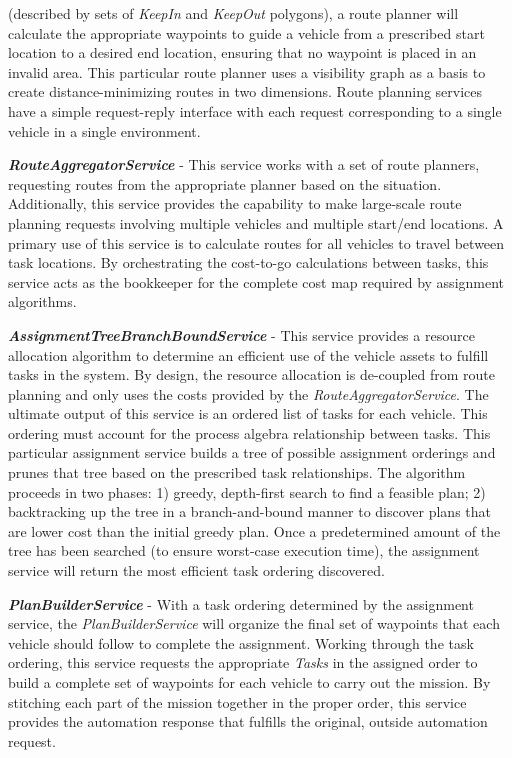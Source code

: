 \begin{description}
  (described by sets of \textit{KeepIn} and \textit{KeepOut} polygons), a route planner will
  calculate the appropriate waypoints to guide a vehicle from a prescribed start location to a
  desired end location, ensuring that no waypoint is placed in an invalid area. This particular
  route planner uses a visibility graph as a basis to create distance-minimizing routes in two
  dimensions. Route planning services have a simple request-reply interface with each request
  corresponding to a single vehicle in a single environment.
\item
  \textbf{\textit{RouteAggregatorService}} - This service works with a set of route planners,
  requesting routes from the appropriate planner based on the situation. Additionally, this service
  provides the capability to make large-scale route planning requests involving multiple vehicles
  and multiple start/end locations. A primary use of this service is to calculate routes for all
  vehicles to travel between task locations. By orchestrating the cost-to-go calculations
  between tasks, this service acts as the bookkeeper for the complete cost map required by
  assignment algorithms.
\item
  \textbf{\textit{AssignmentTreeBranchBoundService}} - This service provides a resource allocation
  algorithm to determine an efficient use of the vehicle assets to fulfill tasks in the system. By
  design, the resource allocation is de-coupled from route planning and only uses the costs
  provided by the \textit{RouteAggregatorService}. The ultimate output of this service is an ordered
  list of tasks for each vehicle. This ordering must account for the process algebra relationship
  between tasks. This particular assignment service builds a tree of possible assignment orderings
  and prunes that tree based on the prescribed task relationships. The algorithm proceeds in two phases:
  1) greedy, depth-first search to find a feasible plan; 2) backtracking up the tree in a
  branch-and-bound manner to discover plans that are lower cost than the initial greedy plan. Once a
  predetermined amount of the tree has been searched (to ensure worst-case execution time), the
  assignment service will return the most efficient task ordering discovered.
\item
  \textbf{\textit{PlanBuilderService}} - With a task ordering determined by the assignment service,
  the \textit{PlanBuilderService} will organize the final set of waypoints that each vehicle should
  follow to complete the assignment. Working through the task ordering, this service requests the
  appropriate \textit{Tasks} in the assigned order to build a complete set of waypoints for each
  vehicle to carry out the mission. By stitching each part of the mission together in the proper
  order, this service provides the automation response that fulfills the original, outside
  automation request.
\end{description}

